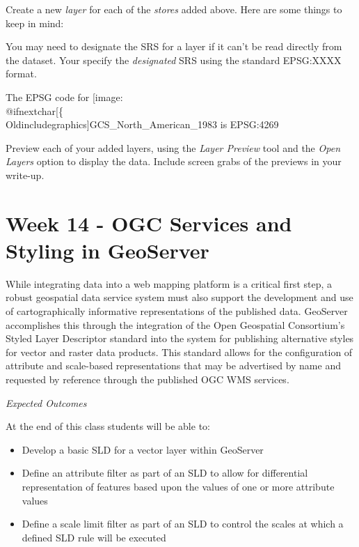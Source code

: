 \documentclass[]{book}
\makeatletter
\providecommand{\tightlist}{%
  \setlength{\itemsep}{0pt}\setlength{\parskip}{0pt}}
\def\ScaleIfNeeded{%
  \ifdim\Gin@nat@width>.5\linewidth
    .5\linewidth
  \else
    \Gin@nat@width
  \fi
}
\let\Oldincludegraphics\texttt{[image: \%
 \\catcode`\\@=11\\relax\%
 \%\\gdef\\includegraphics\{\\@ifnextchar[\{\\Oldincludegraphics]}{\Oldincludegraphics[width=\ScaleIfNeeded]}}%
\gdef\texttt{[image: \\@ifnextchar[\{\\Oldincludegraphics]}{\Oldincludegraphics[max size={.75\textwidth}{.75\textheight}]}}%
\makeatother
\begin{document}
Create a new \emph{layer} for each of the \emph{stores} added above.
Here are some things to keep in mind:

You may need to designate the SRS for a layer if it can't be read
directly from the dataset. Your specify the \emph{designated} SRS using
the standard EPSG:XXXX format.

The EPSG code for \texttt{GCS\_North\_American\_1983} is EPSG:4269

\begin{description}
\tightlist
\item[Question 3]
Preview each of your added layers, using the \emph{Layer Preview} tool
and the \emph{Open Layers} option to display the data. Include screen
grabs of the previews in your write-up.
\end{description}

\chapter{Week 14 - OGC Services and Styling in GeoServer}\label{week14}

While integrating data into a web mapping platform is a critical first
step, a robust geospatial data service system must also support the
development and use of cartographically informative representations of
the published data. GeoServer accomplishes this through the integration
of the Open Geospatial Consortium's Styled Layer Descriptor standard
into the system for publishing alternative styles for vector and raster
data products. This standard allows for the configuration of attribute
and scale-based representations that may be advertised by name and
requested by reference through the published OGC WMS services.

\emph{Expected Outcomes}

At the end of this class students will be able to:

\begin{itemize}
\tightlist
\item
  Develop a basic SLD for a vector layer within GeoServer
\item
  Define an attribute filter as part of an SLD to allow for differential
  representation of features based upon the values of one or more
  attribute values
\item
  Define a scale limit filter as part of an SLD to control the scales at
  which a defined SLD rule will be executed
\end{itemize}
\end{document}
